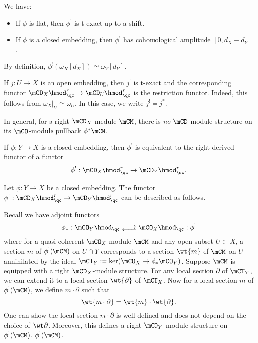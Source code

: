 	\begin{rem}
		We have:
		\begin{itemize}
			\item If $\phi$ is flat, then $\phi^!$ is t-exact up to a shift.
			\item If $\phi$ is a closed embedding, then $\phi^!$ has cohomological amplitude $[0,d_X-d_Y]$.
		\end{itemize}
	\end{rem}

	\begin{exam}
		By definition, $\phi^!(\omega_X[d_X])\simeq \omega_Y[d_Y]$.
	\end{exam}

	\begin{exam}
		If $j:U \to X$ is an open embedding, then $j^!$ is t-exact and the corresponding functor $\mCD_X\hmod^r_\qc\to \mCD_U\hmod^r_\qc$ is the restriction functor. Indeed, this follows from $\omega_X|_{U} \simeq \omega_U$. In this case, we write $j^!=j^*$.
	\end{exam}

	\begin{warn}
		In general, for a right $\mCD_X$-module $\mCM$, there is \emph{no} $\mCD$-module structure on its $\mCO$-module pullback $\phi^*\mCM$.
	\end{warn}

	\begin{facts}
		If $\phi:Y \to X$ is a closed embedding, then $\phi^!$ is equivalent to the right derived functor of a functor
		\[
			\phi^!: \mCD_X\hmod^r_\qc \to \mCD_Y\hmod^r_\qc.
		\]
	\end{facts}

	\begin{constr}
		Let $\phi:Y \to X$ be a closed embedding. The functor $\phi^!: \mCD_X\hmod^r_\qc \to \mCD_Y\hmod^r_\qc$ can be described as follows. 

		Recall we have adjoint functors
		\[
			\phi_*: \mCO_Y\hmod_\qc\adj \mCO_X\hmod_\qc : \phi^! 
		\]
		where for a quasi-coherent $\mCO_X$-module $\mCM$ and any open subset $U\subset X$, a section $m$ of $\phi^!(\mCM)$ on $U\cap Y$ corresponds to a section $\wt{m}$ of $\mCM$ on $U$ annihilated by the ideal $\mCI_Y:=\ker(\mCO_X \to \phi_*\mCO_Y)$. Suppose $\mCM$ is equipped with a right $\mCD_X$-module structure. For any local section $\partial$ of $\mCT_Y$, we can extend it to a local section $\wt{\partial}$ of $\mCT_X$. Now for a local section $m$ of $\phi^!(\mCM)$, we define $m\cdot \partial$ such that
		\[
			\wt{m\cdot \partial} = \wt{m} \cdot \wt{\partial}.
		\]
		One can show the local section $m\cdot \partial$ is well-defined and does not depend on the choice of $\wt\partial$. Moreover, this defines a right $\mCD_Y$-module structure on $\phi^!(\mCM)$. $\phi^!(\mCM)$.

	\end{constr}


